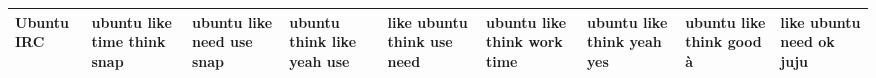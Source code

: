 \documentclass[11pt,a4paper]{article}
\begin{document}
\begin{appendices}
\begin{table}[htb]
\begin{tiny}
\begin{tabular}{|p{}|p{}|p{}|p{}|p{}|p{}|p{}|p{}|p{}|}
    Ubuntu IRC & ubuntu \newline like \newline time \newline think \newline snap & ubuntu \newline like \newline need \newline use \newline snap & ubuntu \newline think \newline like \newline yeah \newline use & like \newline ubuntu \newline think \newline use \newline need & ubuntu \newline like \newline think \newline work \newline time & ubuntu \newline like \newline think \newline yeah \newline yes & ubuntu \newline like \newline think \newline good \newline à & like \newline ubuntu \newline need \newline ok \newline juju\\\hline

\end{tabular}
\end{tiny}
\end{table}
\end{appendices}
\end{document}
